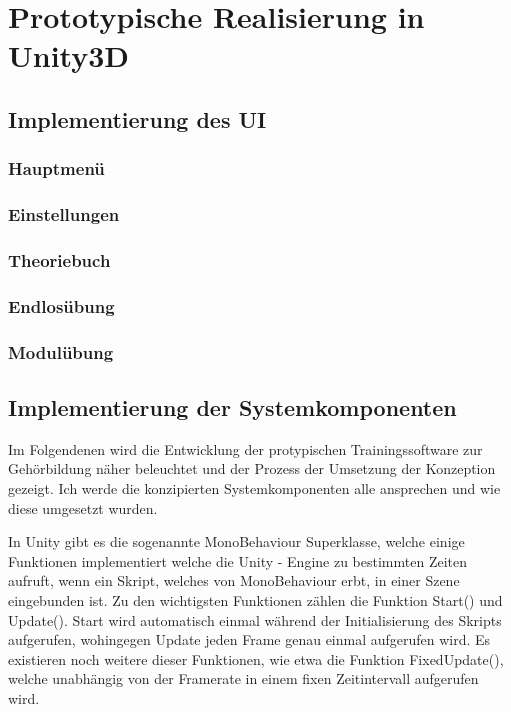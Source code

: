 \chapter{Prototypische Realisierung in Unity3D}

\section{Implementierung des UI}

\subsection*{Hauptmenü}
\subsection*{Einstellungen}
\subsection*{Theoriebuch}
\subsection*{Endlosübung}
\subsection*{Modulübung}

\section{Implementierung der Systemkomponenten}
Im Folgendenen wird die Entwicklung der protypischen Trainingssoftware zur Gehörbildung näher beleuchtet und der Prozess der Umsetzung der Konzeption gezeigt. Ich werde die konzipierten Systemkomponenten alle ansprechen und wie diese umgesetzt wurden. 

In Unity gibt es die sogenannte MonoBehaviour Superklasse, welche einige Funktionen implementiert welche die Unity - Engine zu bestimmten Zeiten aufruft, wenn ein Skript, welches von MonoBehaviour erbt, in einer Szene eingebunden ist. Zu den wichtigsten Funktionen zählen die Funktion Start() und Update(). Start wird automatisch einmal während der Initialisierung des Skripts aufgerufen, wohingegen Update jeden Frame genau einmal aufgerufen wird. Es existieren noch weitere dieser Funktionen, wie etwa die Funktion FixedUpdate(), welche unabhängig von der Framerate in einem fixen Zeitintervall aufgerufen wird.


